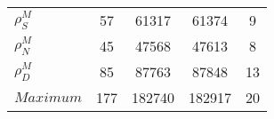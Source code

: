 \begin{center}
\begin{longtable}{lcccc}
$ {\rho^{M}_{S}}       $	 & 	                   57	 & 	                61317	 & 	                61374	 & 	                    9 \\ 
$ {\rho^{M}_{N}}       $	 & 	                   45	 & 	                47568	 & 	                47613	 & 	                    8 \\ 
$ {\rho^{M}_{D}}       $	 & 	                   85	 & 	                87763	 & 	                87848	 & 	                   13 \\ 
$Maximum               $	 & 	                  177	 & 	               182740	 & 	               182917	 & 	                   20 \\ 
\end{longtable}
 \end{center}
